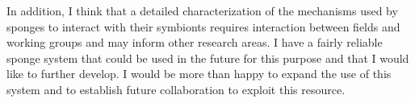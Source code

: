\documentclass[a4paper,11pt]{article}
\begin{document}
In addition, I think that a detailed characterization of the mechanisms used by sponges to interact with their symbionts requires interaction between fields and working groups and may inform other research areas. I have a fairly reliable sponge system that could be used in the future for this purpose and that I would like to further develop. I would be more than happy to expand the use of this system and to establish future collaboration to exploit this resource.




\end{document}
